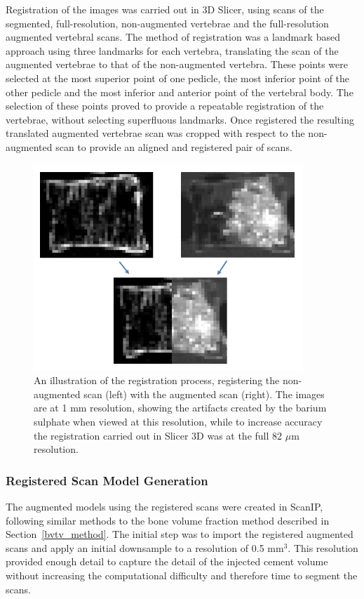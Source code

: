 Registration of the images was carried out in 3D Slicer, using scans of the
segmented, full-resolution, non-augmented vertebrae and the full-resolution
augmented vertebral scans.
The method of registration was a landmark based approach using three landmarks
for each vertebra, translating the scan of the augmented vertebrae to that of the non-augmented vertebra.
These points were selected at the most superior point of one pedicle, the most inferior point of the
other pedicle and the most inferior and anterior point of the vertebral body.
The selection of these points proved to provide a repeatable registration of
the vertebrae, without selecting superfluous landmarks.
Once registered the resulting translated augmented vertebrae scan was cropped
with respect to the non-augmented scan to provide an aligned and registered
pair of scans.

\begin{figure}[ht!]
  \centering
  \includegraphics[width=4in]{Chapters/Chapter_HT_images/reg_demo.png}
  \caption{An illustration of the registration process, registering the
non-augmented scan (left) with the augmented scan (right). The images are at 1
mm resolution, showing the artifacts created by the barium sulphate when viewed
at this resolution, while to increase accuracy the registration carried out in
Slicer 3D was at the full 82 $\mu$m resolution.}
  \label{fig:reg_demo}
\end{figure}

\subsubsection{Registered Scan Model Generation}

The augmented models using the registered scans were created in ScanIP,
following similar methods to the bone volume fraction method described in
Section~\ref{bvtv_method}.
The initial step was to import the registered augmented scans and apply an
initial downsample to a resolution of 0.5 mm$^3$.
This resolution provided enough detail to capture the detail of the injected
cement volume without increasing the computational difficulty and therefore
time to segment the scans.


